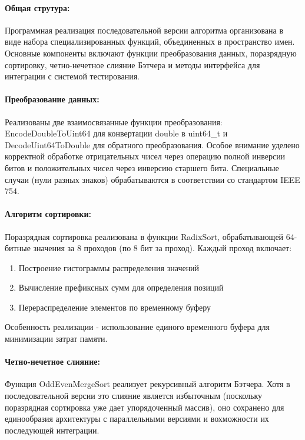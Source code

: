 \documentclass[12pt]{article}
\begin{document}
\paragraph{Общая струтура:}
Программная реализация последовательной версии алгоритма организована в виде набора специализированных функций, объединенных в пространство имен. Основные компоненты включают функции преобразования данных, поразрядную сортировку, четно-нечетное слияние Бэтчера и методы интерфейса для интеграции с системой тестирования.

\paragraph{Преобразование данных:}
Реализованы две взаимосвязанные функции преобразования: EncodeDoubleToUint64 для конвертации double в uint64\_t и DecodeUint64ToDouble для обратного преобразования. Особое внимание уделено корректной обработке отрицательных чисел через операцию полной инверсии битов и положительных чисел через инверсию старшего бита. Специальные случаи (нули разных знаков) обрабатываются в соответствии со стандартом IEEE 754.

\paragraph{Алгоритм сортировки:}
Поразрядная сортировка реализована в функции RadixSort, обрабатывающей 64-битные значения за 8 проходов (по 8 бит за проход). Каждый проход включает:
\begin{enumerate}
	\item Построение гистограммы распределения значений
	\item Вычисление префиксных сумм для определения позиций
	\item Перераспределение элементов по временному буферу
\end{enumerate}
Особенность реализации - использование единого временного буфера для минимизации затрат памяти.

\paragraph{Четно-нечетное слияние:}
Функция OddEvenMergeSort реализует рекурсивный алгоритм Бэтчера. Хотя в последовательной версии это слияние является избыточным (поскольку поразрядная сортировка уже дает упорядоченный массив), оно сохранено для единообразия архитектуры с параллельными версиями и вохможности их последующей интеграции.
\end{document}
